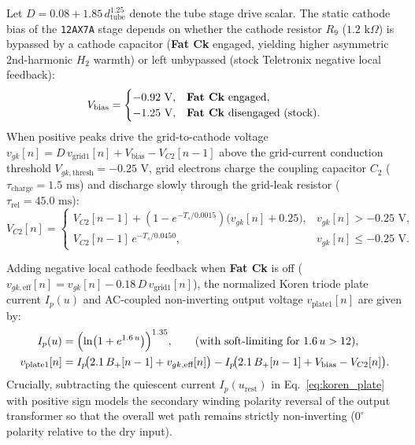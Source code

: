 \documentclass[11pt,a4paper]{article}
\begin{document}
Let $D = 0.08 + 1.85\,d_{\text{tube}}^{1.25}$ denote the tube stage drive scalar. The static cathode bias of the \texttt{12AX7A} stage depends on whether the cathode resistor $R_9$ ($1.2\text{ k}\Omega$) is bypassed by a cathode capacitor (\textbf{Fat Ck} engaged, yielding higher asymmetric 2nd-harmonic $H_2$ warmth) or left unbypassed (stock Teletronix negative local feedback):
\begin{equation}
    V_{\text{bias}} = \begin{cases}
        -0.92\text{ V}, & \text{\textbf{Fat Ck} engaged}, \\
        -1.25\text{ V}, & \text{\textbf{Fat Ck} disengaged (stock)}.
    \end{cases}
\end{equation}
When positive peaks drive the grid-to-cathode voltage $v_{gk}[n] = D\,v_{\text{grid1}}[n] + V_{\text{bias}} - V_{C2}[n-1]$ above the grid-current conduction threshold $V_{gk,\text{thresh}} = -0.25\text{ V}$, grid electrons charge the coupling capacitor $C_2$ ($\tau_{\text{charge}} = 1.5\text{ ms}$) and discharge slowly through the grid-leak resistor ($\tau_{\text{rel}} = 45.0\text{ ms}$):
\begin{equation}
    V_{C2}[n] = \begin{cases}
        V_{C2}[n-1] + \left(1 - e^{-T_s / 0.0015}\right)\bigl(v_{gk}[n] + 0.25\bigr), & v_{gk}[n] > -0.25\text{ V}, \\[0.5em]
        V_{C2}[n-1]\,e^{-T_s / 0.0450}, & v_{gk}[n] \le -0.25\text{ V}.
    \end{cases}
\end{equation}

Adding negative local cathode feedback when \textbf{Fat Ck} is off ($v_{gk,\text{eff}}[n] = v_{gk}[n] - 0.18\,D\,v_{\text{grid1}}[n]$), the normalized Koren triode plate current $I_p(u)$ and AC-coupled non-inverting output voltage $v_{\text{plate1}}[n]$ are given by:
\begin{align}
    I_p(u) &= \Bigl(\ln\bigl(1 + e^{1.6\,u}\bigr)\Bigr)^{1.35}, \qquad (\text{with soft-limiting for } 1.6\,u > 12), \\
    v_{\text{plate1}}[n] &= I_p\!\bigl(2.1\,B_+[n-1] + v_{gk,\text{eff}}[n]\bigr) - I_p\!\bigl(2.1\,B_+[n-1] + V_{\text{bias}} - V_{C2}[n]\bigr).
    \label{eq:koren_plate}
\end{align}
Crucially, subtracting the quiescent current $I_p(u_{\text{rest}})$ in Eq.~\eqref{eq:koren_plate} with positive sign models the secondary winding polarity reversal of the output transformer so that the overall wet path remains strictly non-inverting ($0^\circ$ polarity relative to the dry input).
\end{document}
